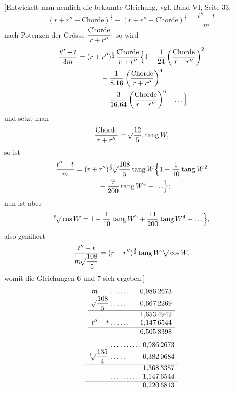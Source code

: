 [Entwickelt man nemlich die bekannte Gleichung, vgl. Band VI, Seite 33,
\[
(r+r''+\text{Chorde})^{\frac{3}{2}}-(r+r''-\text{Chorde})^{\frac{3}{2}}=\frac{t''-t}{m}
\]
nach Potenzen der Grösse \(\dfrac{\text{Chorde}}{r+r''}\mathpunct{\raisebox{.45ex}{,}}\) so wird
\[
\begin{aligned}
\frac{t''-t}{3m}={}&(r+r'')^{\frac{3}{2}}\frac{\text{Chorde}}{r+r''}\Bigl\{1-\frac{1}{24}\left(\frac{\text{Chorde}}{r+r''}\right)^2\\
&\qquad{}-\frac{1}{8\mathord{.}16}\left(\frac{\text{Chorde}}{r+r''}\right)^4\\
&\qquad{}-\frac{3}{16\mathord{.}64}\left(\frac{\text{Chorde}}{r+r''}\right)^6-\mathord{.}\,\mathord{.}\,\mathord{.}\Bigr\}
\end{aligned}
\]
und setzt man
\[
\frac{\text{Chorde}}{r+r''}=\BareRoot{\frac{12}{5}}\mathord{.}\operatorname{tang}W,
\]
so ist
\[
\begin{aligned}
\frac{t''-t}{m}={}&(r+r'')^{\frac{3}{2}}\BareRoot{\frac{108}{5}}\operatorname{tang}W\Bigl\{1-\frac{1}{10}\operatorname{tang}W^2\\
&\qquad{}-\frac{9}{200}\operatorname{tang}W^4-\mathord{.}\,\mathord{.}\,\mathord{.}\Bigr\};
\end{aligned}
\]
nun ist aber
\[
\BareRoot[5]{\cos W}=1-\frac{1}{10}\operatorname{tang}W^2+\frac{11}{200}\operatorname{tang}W^4-\mathord{.}\,\mathord{.}\,\mathord{.}\Bigr\},
\]
also genähert
\[
\frac{t''-t}{m\BareRoot{\dfrac{108}{5}}}=(r+r'')^{\frac{3}{2}}\operatorname{tang}W\BareRoot[5]{\cos W},
\]
womit die Gleichungen 6 und 7 sich ergeben.]
\[
\begin{array}{l@{\;}l@{\;}r}
m&\mathord{.}\,\mathord{.}\,\mathord{.}\,\mathord{.}\,\mathord{.}\,\mathord{.}\,\mathord{.}\,\mathord{.}\,\mathord{.}&0{,}986\,2673\\
\BareRoot{\dfrac{108}{5}}&\mathord{.}\,\mathord{.}\,\mathord{.}\,\mathord{.}\,\mathord{.}&0{,}667\,2269\\[3pt]\hline
&&1{,}653\,4942\\
t''-t&\mathord{.}\,\mathord{.}\,\mathord{.}\,\mathord{.}\,\mathord{.}\,\mathord{.}&1{,}147\,6544\\\hline
&&0{,}505\,8398
\end{array}
\]
\[
\begin{array}{l@{\;}l@{\;}r}
&\mathord{.}\,\mathord{.}\,\mathord{.}\,\mathord{.}\,\mathord{.}\,\mathord{.}\,\mathord{.}\,\mathord{.}\,\mathord{.}\,\mathord{.}&0{,}986\,2673\\
\BareRoot[4]{\dfrac{135}{4}}&\mathord{.}\,\mathord{.}\,\mathord{.}\,\mathord{.}\,\mathord{.}&0{,}382\,0684\\[3pt]\hline
&&1{,}368\,3357\\
&\mathord{.}\,\mathord{.}\,\mathord{.}\,\mathord{.}\,\mathord{.}\,\mathord{.}\,\mathord{.}\,\mathord{.}\,\mathord{.}\,\mathord{.}&1{,}147\,6544\\\hline
&&0{,}220\,6813
\end{array}
\]

